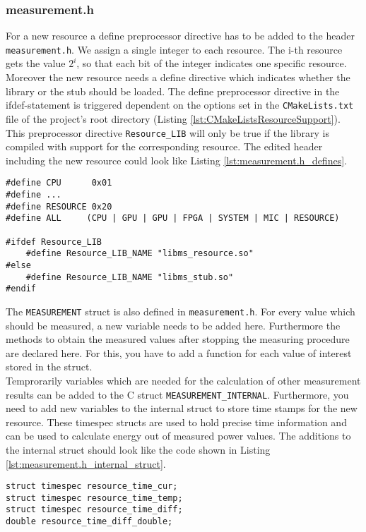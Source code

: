 \subsubsection{measurement.h}
\label{sec:measurement_h}
For a new resource a define preprocessor directive has to be added to the header \texttt{measurement.h}. We assign a single integer to each resource. The i-th resource gets the value $2^{i}$, so that each bit of the integer indicates one specific resource. Moreover the new resource needs a define directive which indicates whether the library or the stub should be loaded. The define preprocessor directive in the ifdef-statement is triggered dependent on the options set in the \texttt{CMakeLists.txt} file of the project's root directory (Listing \ref{lst:CMakeListsResourceSupport}). This preprocessor directive \texttt{Resource\_LIB} will only be true if the library is compiled with support for the corresponding resource. The edited header including the new resource could look like Listing \ref{lst:measurement.h_defines}.
\begin{lstlisting}[caption={Extended \texttt{measurement.h} header file with new define directives to support a new resource.},label=lst:measurement.h_defines]
#define CPU		 0x01
#define ...
#define RESOURCE 0x20
#define ALL		(CPU | GPU | GPU | FPGA | SYSTEM | MIC | RESOURCE)
		
#ifdef Resource_LIB
	#define Resource_LIB_NAME "libms_resource.so"
#else
	#define Resource_LIB_NAME "libms_stub.so"
#endif
\end{lstlisting}
The \texttt{MEASUREMENT} struct is also defined in \texttt{measurement.h}. For every value which should be measured, a new variable needs to be added here. Furthermore the methods to obtain the measured values after stopping the measuring procedure are declared here. For this, you have to add a function for each value of interest stored in the struct.\\
Temprorarily variables which are needed for the calculation of other measurement results can be added to the C struct \texttt{MEASUREMENT\_INTERNAL}. Furthermore, you need to add new variables to the internal struct to store time stamps for the new resource. These timespec structs are used to hold precise time information and can be used to calculate energy out of measured power values. The additions to the internal struct should look like the code shown in Listing \ref{lst:measurement.h_internal_struct}.
\begin{lstlisting}[caption={Extensions for the \texttt{MEAUSREMENT\_INTERNAL} struct defined in \texttt{measurement.h}.}, label=lst:measurement.h_internal_struct]
struct timespec resource_time_cur;
struct timespec resource_time_temp;
struct timespec resource_time_diff;
double resource_time_diff_double;
\end{lstlisting}

